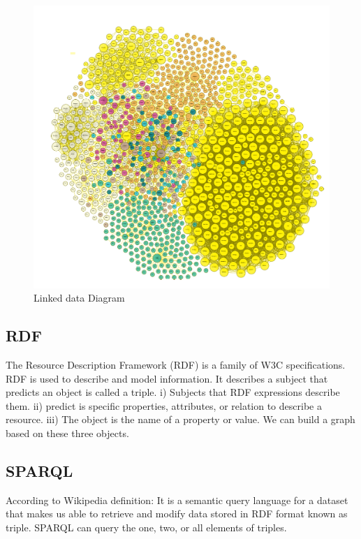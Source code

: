 \begin{center}
	\begin{figure}[htb!]
		
		\begin{minipage}{0.55\linewidth}
			\centering
			\includegraphics[width=1.55\textwidth]{images/chap02_LinkData.png}
		\end{minipage}
		\caption[Linked data diagram]{Linked data Diagram\cite{Hector}}
		
		
	\end{figure}
	
\end{center}
\subsection{RDF}
The Resource Description Framework (RDF) is a family
of W3C specifications. RDF is used to describe and model information. It describes a subject that predicts an object is called a triple.
i) Subjects that RDF expressions describe them.
ii) predict is specific properties, attributes, or relation to describe a resource.
iii) The object is the name of a property or value.
We can build a graph based on these three objects\cite{Hector}.

\subsection{SPARQL}
According to Wikipedia definition: It is a semantic query language for a dataset that makes us able to retrieve and modify data stored in RDF format known as triple. SPARQL can query the one, two, or all elements of triples.    

